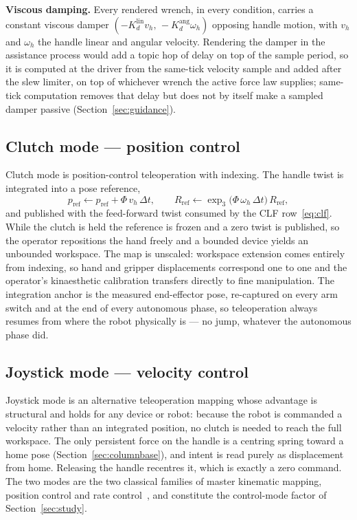 \documentclass[12pt,a4paper,twoside,openright]{report}
\begin{document}
\textbf{Viscous damping.} Every rendered wrench, in every condition, carries a constant viscous damper $(-K_d^{\text{lin}} v_h,\, -K_d^{\text{ang}} \omega_h)$ opposing handle motion, with $v_h$ and $\omega_h$ the handle linear and angular velocity. Rendering the damper in the assistance process would add a topic hop of delay on top of the sample period, so it is computed at the driver from the same-tick velocity sample and added after the slew limiter, on top of whichever wrench the active force law supplies; same-tick computation removes that delay but does not by itself make a sampled damper passive (Section~\ref{sec:guidance}).

\subsection{Clutch mode --- position control}
\label{sec:clutchmode}

Clutch mode is position-control teleoperation with indexing. The handle twist is integrated into a pose reference,
\begin{equation}
p_{\text{ref}} \leftarrow p_{\text{ref}} + \Phi\, v_h\,\Delta t,
\qquad
R_{\text{ref}} \leftarrow \exp_3\!\bigl(\Phi\,\omega_h\,\Delta t\bigr)\, R_{\text{ref}},
\label{eq:clutchint}
\end{equation}
and published with the feed-forward twist consumed by the CLF row~\eqref{eq:clf}. While the clutch is held the reference is frozen and a zero twist is published, so the operator repositions the hand freely and a bounded device yields an unbounded workspace. The map is unscaled: workspace extension comes entirely from indexing, so hand and gripper displacements correspond one to one and the operator's kinaesthetic calibration transfers directly to fine manipulation. The integration anchor is the measured end-effector pose, re-captured on every arm switch and at the end of every autonomous phase, so teleoperation always resumes from where the robot physically is --- no jump, whatever the autonomous phase did.

\subsection{Joystick mode --- velocity control}
\label{sec:joystick}

Joystick mode is an alternative teleoperation mapping whose advantage is structural and holds for any device or robot: because the robot is commanded a velocity rather than an integrated position, no clutch is needed to reach the full workspace. The only persistent force on the handle is a centring spring toward a home pose (Section~\ref{sec:columnbase}), and intent is read purely as displacement from home. Releasing the handle recentres it, which is exactly a zero command. The two modes are the two classical families of master kinematic mapping, position control and rate control~\cite{kim1987comparison}, and constitute the control-mode factor of Section~\ref{sec:study}.
\end{document}
